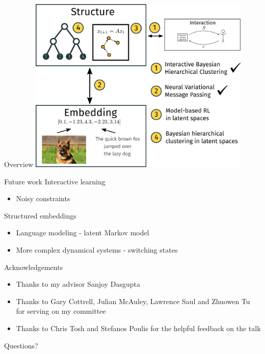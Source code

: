 \documentclass[10pt, compress]{beamer}
\begin{document}
\begin{frame}{Overview}
  \centering
  \includegraphics[width=0.8\textwidth]{img/overview-4}
\end{frame}

\begin{frame}{Future work}
    Interactive learning
    \begin{itemize}
        \item Noisy constraints
    \end{itemize}
        \pause
    
    Structured embeddings
    \begin{itemize}
    \pause
        \item Language modeling - latent Markov model
    \pause
        \item More complex dynamical systems - switching states
    \end{itemize}
\end{frame}

\begin{frame}{Acknowledgements}
    \begin{itemize}
        \item Thanks to my advisor Sanjoy Dasgupta
        \item Thanks to Gary Cottrell, Julian McAuley, Lawrence Saul 
        and Zhuowen Tu for serving on my committee
        \item Thanks to Chris Tosh and Stefanos Poulis for the helpful feedback on the talk
    \end{itemize}
\end{frame}

\begin{frame}[standout]
Questions?
\end{frame}
\end{document}
